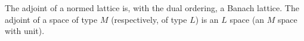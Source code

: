 The adjoint of a normed lattice is, with the dual ordering, a Banach lattice. The adjoint of a space of type $M$ (respectively, of type $L$) is an $L$ space (an $M$ space with unit).
